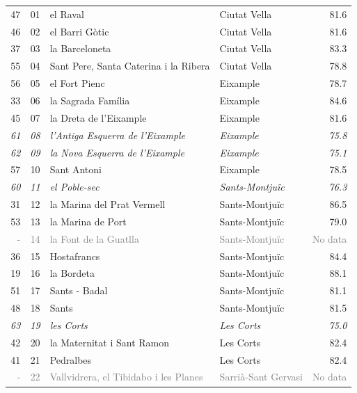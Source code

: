 {\begin{longtable}{rrllr}
          47 & 01 & el Raval & Ciutat Vella & 81.6 \\ 
          46 & 02 & el Barri Gòtic & Ciutat Vella & 81.6 \\ 
          37 & 03 & la Barceloneta & Ciutat Vella & 83.3 \\
          55 & 04 & Sant Pere, Santa Caterina i la Ribera & Ciutat Vella & 78.8 \\ 
          56 & 05 & el Fort Pienc & Eixample & 78.7 \\
          33 & 06 & la Sagrada Família & Eixample & 84.6 \\ 
          45 & 07 & la Dreta de l'Eixample & Eixample & 81.6 \\ 
          \textit{61} & \textit{08} & \textit{l'Antiga Esquerra de l'Eixample} &  \textit{Eixample} & \textit{75.8} \\
        \textit{62} & \textit{09} & \textit{la Nova Esquerra de l'Eixample} & \textit{Eixample} & \textit{75.1} \\
          57 & 10 & Sant Antoni & Eixample & 78.5 \\
          \textit{60} & \textit{11} & \textit{el Poble-sec} & \textit{Sants-Montjuïc} &  \textit{76.3} \\
          31 & 12 & la Marina del Prat Vermell & Sants-Montjuïc & 86.5 \\
          53 & 13 & la Marina de Port & Sants-Montjuïc & 79.0 \\
          \textcolor{gray}{-} & \textcolor{gray}{14} & \textcolor{gray}{la Font de la Guatlla} & \textcolor{gray}{Sants-Montjuïc} & \textcolor{gray}{No data} \\
          36 & 15 & Hostafrancs & Sants-Montjuïc & 84.4 \\
          19 & 16 & la Bordeta & Sants-Montjuïc & 88.1 \\ 
          51 & 17 & Sants - Badal & Sants-Montjuïc & 81.1 \\
          48 & 18 & Sants & Sants-Montjuïc & 81.5 \\
          \textit{63} & \textit{19} & \textit{les Corts} & \textit{Les Corts} & \textit{75.0} \\
          42 & 20 & la Maternitat i Sant Ramon & Les Corts & 82.4 \\
          41 & 21 & Pedralbes & Les Corts & 82.4 \\
          \textcolor{gray}{-} & \textcolor{gray}{22} & \textcolor{gray}{Vallvidrera, el Tibidabo i les Planes} & \textcolor{gray}{Sarrià-Sant Gervasi} & \textcolor{gray}{No data} \\

\end{longtable}}
